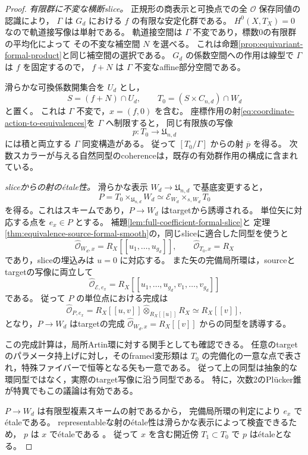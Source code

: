 \begin{proof}
\emph{有限群に不変な横断slice。}
正規形の商表示と可換点での全 $\mathcal O$ 保存同値の認識により，
$\Gamma$ は $G_d$ における $f$ の有限な安定化群である。
$H^0(X,T_X)=0$ なので軌道接写像は単射である。
軌道接空間は $\Gamma$ 不変であり，標数0の有限群の平均化によって
その不変な補空間 $N$ を選べる。
これは命題\ref{prop:equivariant-formal-product}と同じ補空間の選択である。
$G_d$ の係数空間への作用は線型で $\Gamma$ は $f$ を固定するので，
$f+N$ は $\Gamma$ 不変なaffine部分空間である。

滑らかな可換係数開集合を $U_d$ とし，
\[
 S=(f+N)\cap U_d,\qquad
 T_0=(S\times C_{n,d})\cap W_d
\]
と置く。
これは $\Gamma$ 不変で，$x=(f,0)$ を含む。
座標作用の射\eqref{eq:coordinate-action-to-equivalences}を $\Gamma$ へ制限すると，
同じ有限族の写像
\[
 p:T_0\longrightarrow\mathfrak U_{n,d}
\]
には積と両立する $\Gamma$ 同変構造がある。
従って $[T_0/\Gamma]$ からの射 $\overline p$ を得る。
次数スカラーが与える自然同型のcoherenceは，既存の有効群作用の構成に含まれている。

\emph{sliceからの射の\'{e}tale性。}
滑らかな表示 $W_d\to\mathfrak U_{n,d}$ で基底変更すると，
\[
 P=T_0\times_{\mathfrak U_{n,d}}W_d
   \simeq\mathcal E_{W_d}\times_{s,W_d}T_0
\]
を得る。これはスキームであり，$P\to W_d$ はtargetから誘導される。
単位矢に対応する点を $e_x\in P$ とする。
補題\ref{lem:full-coefficient-formal-slice}と
定理\ref{thm:equivalence-source-formal-smooth}の，同じsliceに適合した同型を使うと
\[
 \widehat{\mathcal O}_{W_d,x}=R_X[[u_1,\ldots,u_{g_d}]],
 \qquad
 \widehat{\mathcal O}_{T_0,x}=R_X
\]
であり，sliceの埋込みは $u=0$ に対応する。
また矢の完備局所環は，sourceとtargetの写像に両立して
\[
 \widehat{\mathcal O}_{\mathcal E,e_x}
       =R_X[[u_1,\ldots,u_{g_d},v_1,\ldots,v_{g_d}]]
\]
である。
従って $P$ の単位点における完成は
\[
 \widehat{\mathcal O}_{P,e_x}
   =R_X[[u,v]]\widehat\otimes_{R_X[[u]]}R_X
   \simeq R_X[[v]],
\]
となり，$P\to W_d$ はtargetの完成
$\widehat{\mathcal O}_{W_d,x}=R_X[[v]]$ からの同型を誘導する。

この完成計算は，局所Artin環に対する関手としても確認できる。
任意のtargetのパラメータ持上げに対し，そのframed変形類は
$T_0$ の完備化の一意な点で表され，特殊ファイバーで恒等となる矢も一意である。
従って上の同型は抽象的な環同型ではなく，実際のtarget写像に沿う同型である。
特に，次数2のPl\"ucker錐が特異でもこの議論は有効である。

$P\to W_d$ は有限型複素スキームの射であるから，
完備局所環の判定\cite[Lemma~41.11.3, Tag~039M]{StacksProject}により
$e_x$ で\'{e}taleである。
representableな射の\'{e}tale性は滑らかな表示によって検査できるため，
$p$ は $x$ で\'{e}taleである
\cite[Section~100.3, Tag~04XB]{StacksProject}。
従って $x$ を含む開近傍 $T_1\subset T_0$ で $p$ は\'{e}taleとなる。


\end{proof}
